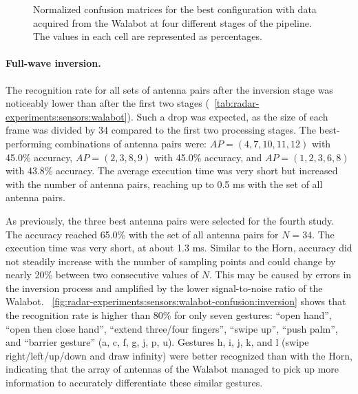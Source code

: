 \begin{figure}[!tb]
    \vspace{-6pt}
    \caption{Normalized confusion matrices for the best configuration with data acquired from the Walabot at four different stages of the pipeline. The values in each cell are represented as percentages.}
    \label{fig:radar-experiments:sensors:walabot-confusion}
\end{figure}


\paragraph{Full-wave inversion.}
The recognition rate for all sets of antenna pairs after the inversion stage was noticeably lower than after the first two stages (\tab~\ref{tab:radar-experiments:sensors:walabot}). Such a drop was expected, as the size of each frame was divided by 34 compared to the first two processing stages. 
%
The best-performing combinations of antenna pairs were: $AP{=}(4, 7, 10, 11, 12)$ with 45.0\% accuracy, $AP{=}(2, 3, 8, 9)$ with 45.0\% accuracy, and $AP{=}(1, 2, 3, 6, 8)$ with 43.8\% accuracy. The average execution time was very short but increased with the number of antenna pairs, reaching up to 0.5 ms with the set of all antenna pairs. 

As previously, the three best antenna pairs were selected for the fourth study. The accuracy reached 65.0\% with the set of all antenna pairs for $N{=}34$. The execution time was very short, at about 1.3 ms. 
Similar to the Horn, accuracy did not steadily increase with the number of sampling points and could change by nearly 20\% between two consecutive values of $N$. This may be caused by errors in the inversion process and amplified by the lower signal-to-noise ratio of the Walabot.
%
\fig~\ref{fig:radar-experiments:sensors:walabot-confusion:inversion} shows that the recognition rate is higher than 80\% for only seven gestures: ``open hand'', ``open then close hand'', ``extend three/four fingers'', ``swipe up'', ``push palm'', and ``barrier gesture'' (a, c, f, g, j, p, u). 
%
Gestures h, i, j, k, and l (swipe right/left/up/down and draw infinity) were better recognized than with the Horn, indicating that the array of antennas of the Walabot managed to pick up more information to accurately differentiate these similar gestures.

